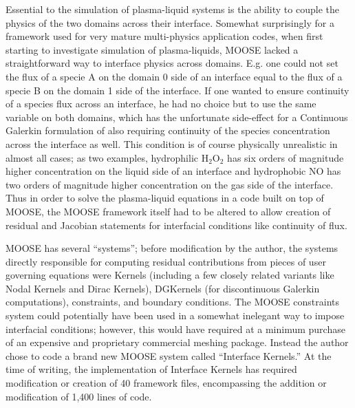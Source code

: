Essential to the simulation of plasma-liquid systems is the ability to couple the physics of the two domains across their interface. Somewhat surprisingly for a framework used for very mature multi-physics application codes, when first starting to investigate simulation of plasma-liquids, MOOSE lacked a straightforward way to interface physics across domains. E.g. one could not set the flux of a specie A on the domain 0 side of an interface equal to the flux of a specie B on the domain 1 side of the interface. If one wanted to ensure continuity of a species flux across an interface, he had no choice but to use the same variable on both domains, which has the unfortunate side-effect for a Continuous Galerkin formulation of also requiring continuity of the species concentration across the interface as well. This condition is of course physically unrealistic in almost all cases; as two examples, hydrophilic H$_2$O$_2$ has six orders of magnitude higher concentration on the liquid side of an interface and hydrophobic NO has two orders of magnitude higher concentration on the gas side of the interface. Thus in order to solve the plasma-liquid equations in a code built on top of MOOSE, the MOOSE framework itself had to be altered to allow creation of residual and Jacobian statements for interfacial conditions like continuity of flux.

MOOSE has several ``systems''; before modification by the author, the systems directly responsible for computing residual contributions from pieces of user governing equations were Kernels (including a few closely related variants like Nodal Kernels and Dirac Kernels), DGKernels (for discontinuous Galerkin computations), constraints, and boundary conditions. The MOOSE constraints system could potentially have been used in a somewhat inelegant way to impose interfacial conditions; however, this would have required at a minimum purchase of an expensive and proprietary commercial meshing package. Instead the author chose to code a brand new MOOSE system called ``Interface Kernels.'' At the time of writing, the implementation of Interface Kernels has required modification or creation of 40 framework files, encompassing the addition or modification of 1,400 lines of code.

